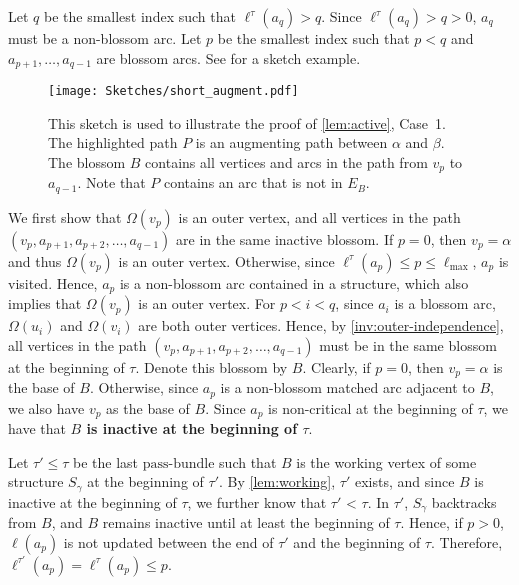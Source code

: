 \documentclass{article}
\newcommand{\alp}{\alpha}
\newcommand{\Omg}{\Omega}
\newcommand{\lmax}{\ell_{\max}}
\newcommand{\bundle}{\text{pass-bundle}\xspace}
\begin{document}
    Let $q$ be the smallest index such that $\ell^{\tau}(a_q) > q$.
    Since $\ell^{\tau}(a_q) > q > 0$, $a_q$ must be a non-blossom arc.
    Let $p$ be the smallest index such that $p < q$ and $a_{p+1}, \dots, a_{q-1}$ are blossom arcs.
    See  for a sketch example.


    \begin{figure}[h]
    \centering
    \texttt{[image: Sketches/short\_augment.pdf]}
    \caption{
    This sketch is used to illustrate the proof of \cref{lem:active}, Case~1.
    The highlighted path $P$ is an augmenting path between $\alp$ and $\beta$.
    The blossom $B$ contains all vertices and arcs in the path from $v_p$ to $a_{q-1}$.
    Note that $P$ contains an arc that is not in $E_B$.
    }
    \label{fig:short-augment}
    \end{figure}
    
    We first show that $\Omg(v_p)$ is an outer vertex, and all vertices in the path $(v_p, a_{p+1}, a_{p+2}, \dots, a_{q-1})$ are in the same inactive blossom.
    If $p = 0$, then $v_p = \alp$ and thus $\Omg(v_p)$ is an outer vertex.
    Otherwise, since $\ell^{\tau}(a_p) \leq p \leq \lmax$, $a_p$ is visited.
    Hence, $a_p$ is a non-blossom arc contained in a structure, which also implies that $\Omg(v_p)$ is an outer vertex.
    For $p < i < q$, since $a_i$ is a blossom arc, $\Omg(u_i)$ and $\Omg(v_i)$ are both outer vertices.
    Hence, by \cref{inv:outer-independence}, all vertices in the path $(v_p, a_{p+1}, a_{p+2}, \dots, a_{q-1})$ must be in the same blossom at the beginning of $\tau$.
    Denote this blossom by $B$.
    Clearly, if $p = 0$, then $v_p = \alp$ is the base of $B$.
    Otherwise, since $a_p$ is a non-blossom matched arc adjacent to $B$, we also have $v_p$ as the base of $B$.
    Since $a_p$ is non-critical at the beginning of $\tau$, we have that \textbf{$B$ is inactive at the beginning of $\tau$}.


    
    Let $\tau' \leq \tau$ be the last $\bundle$ such that $B$ is the working vertex of some structure $S_\gamma$ at the beginning of $\tau'$.
    By \cref{lem:working}, $\tau'$ exists, and since $B$ is inactive at the beginning of $\tau$, we further know that $\tau'$ < $\tau$.
    In $\tau'$, $S_\gamma$ backtracks from $B$, and $B$ remains inactive until at least the beginning of $\tau$.
    Hence, if $p > 0$, $\ell(a_p)$ is not updated between the end of $\tau'$ and the beginning of $\tau$.
    Therefore, \textbf{$\ell^{\tau'}(a_p) = \ell^{\tau}(a_p) \leq p$}.
\end{document}
